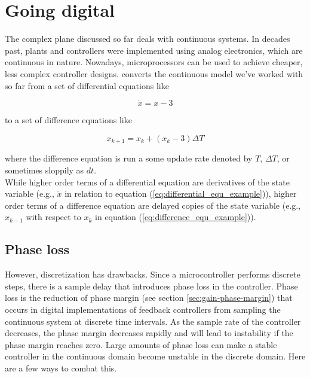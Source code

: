 \chapter{Going digital}

The complex plane discussed so far deals with continuous \glspl{system}. In
decades past, \glspl{plant} and controllers were implemented using analog
electronics, which are continuous in nature. Nowadays, microprocessors can be
used to achieve cheaper, less complex controller designs.
 converts the continuous model we've
worked with so far from a set of differential equations like

\begin{equation}
  \dot{x} = x - 3 \label{eq:differential_equ_example}
\end{equation}

\noindent to a set of difference equations like

\begin{equation}
  x_{k+1} = x_k + (x_k - 3) \Delta T \label{eq:difference_equ_example}
\end{equation}

\noindent where the difference equation is run a some update rate denoted by
$T$, $\Delta T$, or sometimes sloppily as $dt$. \\

While higher order terms of a differential equation are derivatives of the state
variable (e.g., $\ddot{x}$ in relation to equation
(\ref{eq:differential_equ_example})), higher order terms of a difference
equation are delayed copies of the state variable (e.g., $x_{k-1}$ with respect
to $x_k$ in equation (\ref{eq:difference_equ_example})).

\section{Phase loss}

However, \gls{discretization} has drawbacks. Since a microcontroller performs
discrete steps, there is a sample delay that introduces phase loss in the
controller. Phase loss is the reduction of phase margin (see section
\ref{sec:gain-phase-margin}) that occurs in digital implementations of feedback
controllers from sampling the continuous system at discrete time intervals. As
the sample rate of the controller decreases, the phase margin decreases rapidly
and will lead to instability if the phase margin reaches zero. Large amounts of
phase loss can make a stable controller in the continuous domain become unstable
in the discrete domain. Here are a few ways to combat this.


